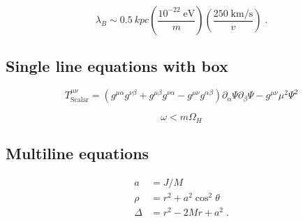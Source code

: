 \vspace{0.4cm}

\begin{equation}
	\lambda_B \sim \SI{0.5}{kpc} \left( \frac{ 10^{-22} \; \text{eV} }{m} \right) \left( \frac{ 250 \; \text{km/s} }{v} \right) \;.
\end{equation}

\vspace{0.4cm}

\subsection*{Single line equations with box}

\vspace{0.4cm}

\begin{equation}
		\boxed{
				T_{\text{Scalar}}^{\mu \nu} = 
				(g^{\mu \alpha}g^{\nu \beta} + g^{\mu \beta}g^{\nu \alpha} - g^{\mu \nu}g^{\alpha \beta}) \partial_\alpha \Psi \partial_\beta \Psi - g^{\mu \nu} \mu^2 \Psi^2 
		}
	\label{eq:superradiant_condition}
\end{equation}

\begin{equation}
	\boxed{
		\boxed{
			\omega < m \Omega_H
		}
	}
	\label{eq:superradiant_condition_2}
\end{equation}


\vspace{0.4cm}


\subsection*{Multiline equations}

\vspace{0.4cm}

\begin{equation}
	\begin{aligned}
		a 		&= J/M \\
		\rho 	&= r^2 + a^2 \cos^2 \theta  \\
		\Delta	&= r^2 - 2 M r + a^2 \; .
	\end{aligned}
\end{equation}

\vspace{0.4cm}

